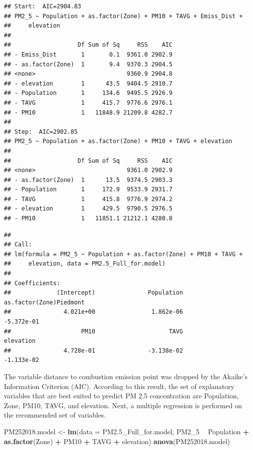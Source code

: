 \documentclass[12pt,]{article}
\newenvironment{Shaded}{\begin{snugshade}}{\end{snugshade}}
\newcommand{\KeywordTok}[1]{\textcolor[rgb]{0.13,0.29,0.53}{\textbf{#1}}}
\newcommand{\DataTypeTok}[1]{\textcolor[rgb]{0.13,0.29,0.53}{#1}}
\newcommand{\DecValTok}[1]{\textcolor[rgb]{0.00,0.00,0.81}{#1}}
\newcommand{\StringTok}[1]{\textcolor[rgb]{0.31,0.60,0.02}{#1}}
\newcommand{\OperatorTok}[1]{\textcolor[rgb]{0.81,0.36,0.00}{\textbf{#1}}}
\newcommand{\NormalTok}[1]{#1}
\begin{document}
\begin{verbatim}
## Start:  AIC=2904.83
## PM2_5 ~ Population + as.factor(Zone) + PM10 + TAVG + Emiss_Dist + 
##     elevation
## 
##                   Df Sum of Sq     RSS    AIC
## - Emiss_Dist       1       0.1  9361.0 2902.9
## - as.factor(Zone)  1       9.4  9370.3 2904.5
## <none>                          9360.9 2904.8
## - elevation        1      43.5  9404.5 2910.7
## - Population       1     134.6  9495.5 2926.9
## - TAVG             1     415.7  9776.6 2976.1
## - PM10             1   11848.9 21209.8 4282.7
## 
## Step:  AIC=2902.85
## PM2_5 ~ Population + as.factor(Zone) + PM10 + TAVG + elevation
## 
##                   Df Sum of Sq     RSS    AIC
## <none>                          9361.0 2902.9
## - as.factor(Zone)  1      13.5  9374.5 2903.3
## - Population       1     172.9  9533.9 2931.7
## - TAVG             1     415.8  9776.9 2974.2
## - elevation        1     429.5  9790.5 2976.5
## - PM10             1   11851.1 21212.1 4280.8
\end{verbatim}

\begin{verbatim}
## 
## Call:
## lm(formula = PM2_5 ~ Population + as.factor(Zone) + PM10 + TAVG + 
##     elevation, data = PM2.5_Full_for.model)
## 
## Coefficients:
##             (Intercept)               Population  as.factor(Zone)Piedmont  
##               4.021e+00                1.862e-06               -5.372e-01  
##                    PM10                     TAVG                elevation  
##               4.728e-01               -3.138e-02               -1.133e-02
\end{verbatim}

The variable distance to combustion emission point was dropped by the
Akaike's Information Criterion (AIC). According to this result, the set
of explanatory variables that are best suited to predict PM 2.5
concentration are Population, Zone, PM10, TAVG, and elevation. Next, a
multiple regression is performed on the recommended set of variables.

\begin{Shaded}
\begin{Highlighting}[]
\NormalTok{PM252018.model <-}\StringTok{ }
\StringTok{  }\KeywordTok{lm}\NormalTok{(}\DataTypeTok{data =}\NormalTok{ PM2.5_Full_for.model, PM2_}\DecValTok{5} \OperatorTok{~}\StringTok{ }
\StringTok{       }\NormalTok{Population }\OperatorTok{+}\StringTok{ }\KeywordTok{as.factor}\NormalTok{(Zone) }\OperatorTok{+}\StringTok{ }\NormalTok{PM10 }\OperatorTok{+}\StringTok{ }\NormalTok{TAVG }\OperatorTok{+}\StringTok{ }\NormalTok{elevation)}
\KeywordTok{anova}\NormalTok{(PM252018.model)}
\end{Highlighting}
\end{Shaded}
\end{document}
